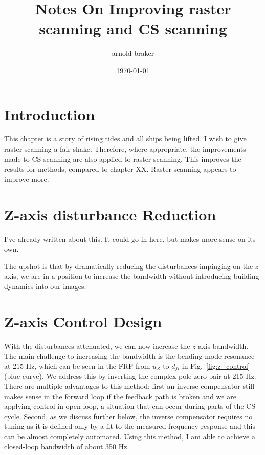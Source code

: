 \documentclass[11pt]{article}
\author{arnold braker}
\date{\today}
\title{Notes On Improving raster scanning and CS scanning}
\begin{document}
\maketitle
\tableofcontents

\section{Introduction}
This chapter is a story of rising tides and all ships being lifted. I wish to give raster scanning a fair shake. Therefore, where appropriate, the improvements made to CS scanning are also applied to raster scanning. This improves the results for methods, compared to chapter XX. Raster scanning appears to improve more.

\section{Z-axis disturbance Reduction}
I've already written about this. It could go in here, but makes more sense on its own. 

The upshot is that by dramatically reducing the disturbances impinging on the $z$-axis, we are in a position to increase the bandwidth without introducing building dynamics into our images.

\section{Z-axis Control Design}
With the disturbances attenuated, we can now increase the $z$-axis bandwidth. The main challenge to increasing the bandwidth is the bending mode resonance at 215 Hz, which can be seen in the FRF from $u_Z$ to $d_{fl}$ in Fig.~\ref{fig:z_control} (blue curve). We address this by inverting the complex pole-zero pair at 215 Hz. There are multiple advantages to this method: first an inverse compensator still makes sense in the forward loop if the feedback path is broken and we are applying control in open-loop, a situation that can occur during parts of the CS cycle. Second, as we discuss further below, the inverse compensator requires no tuning as it is defined only by a fit to the measured frequency response and this can be almost completely automated. Using this method, I am able to achieve a closed-loop bandwidth of about 350 Hz.
\end{document}
